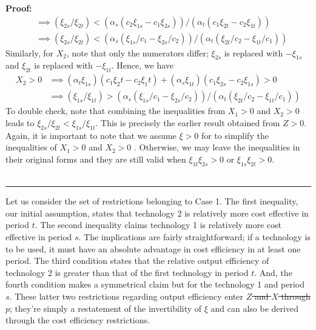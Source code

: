\documentclass[11pt,a4paper,leqno]{extarticle}
\newenvironment{proof}[1][Proof]{\noindent\textbf{#1:} }{\ \rule{0.5em}{0.5em}}
\providecommand{\DIFadd}[1]{{\protect\color{blue}\uwave{#1}}} %
\providecommand{\DIFdel}[1]{{\protect\color{red}\sout{#1}}}                      %
\providecommand{\DIFaddbegin}{} %
\providecommand{\DIFaddend}{} %
\providecommand{\DIFdelbegin}{} %
\providecommand{\DIFdelend}{} %
\begin{document}
\begin{proof}
\begin{align*}
	&\implies (\xi_{2s}/\xi_{2t}) < (\alpha_s (c_2 \xi_{1s} - c_1 \xi_{2s}))/(\alpha_t(c_1 \xi_{2t} - c_2\xi_{1t})) \\
	&\implies (\xi_{2s}/\xi_{2t}) < (\alpha_s (\xi_{1s}/c_1 -  \xi_{2s}/c_2))/(\alpha_t(\xi_{2t}/c_2 - \xi_{1t}/c_1)) 
	\end{align*}
	Similarly, for $X_2$, note that only the numerators differ; $\xi_{2s}$ is replaced with $-\xi_{1s}$ and $\xi_{2t}$ is replaced with $-\xi_{1t}$. Hence, we have
	\begin{align*}
	X_2 > 0 &\implies (\alpha_t \xi_{1s})(c_1 \xi_2t - c_2\xi_1t) + (\alpha_s \xi_{1t})(c_1 \xi_{2s} - c_2 \xi_{1s}) > 0\\
	&\implies (\xi_{1s}/\xi_{1t}) > (\alpha_s (\xi_{1s}/c_1 -  \xi_{2s}/c_2))/(\alpha_t(\xi_{2t}/c_2 - \xi_{1t}/c_1)) 
	\end{align*}
	To double check, note that combining the inequalities from $X_1>0$ and $X_2 > 0$ leads to $\xi_{2s}/\xi_{2t} < \xi_{1s}/\xi_{1t}$. This is precisely the earlier result obtained from \DIFdelbegin \DIFdel{$Z > 0$}\DIFdelend \DIFaddbegin \DIFadd{$\mathbf{Z} > 0$}\DIFaddend . Again, it is  important to note that we assume \DIFdelbegin \DIFdel{$\xi > 0$ }\DIFdelend \DIFaddbegin \DIFadd{$\boldsymbol{\xi} > 0$ }\DIFaddend for to simplify the inequalities of $X_1 > 0$ and $X_2 > 0$ . Otherwise, we may leave the inequalities in their original forms and they are still valid when  $\xi_{1t} \xi_{2s} > 0$ or $\xi_{1s} \xi_{2t} > 0$.   \\ \hfill
\end{proof}

Let us consider the set of restrictions belonging to Case 1. The first inequality, our initial assumption, states that technology 2 is relatively more cost effective in period $t$. The second inequality claims technology 1 is relatively more cost effective in period $s$. The implications are fairly straightforward; if a technology is to be used, it must have an absolute advantage in cost efficiency in at least one period. The third condition states that the relative output efficiency of technology 2 is greater than that of the first technology in period $t$. And, the fourth condition makes a symmetrical claim but for the technology 1 and period $s$. These latter two restrictions regarding output efficiency enter \DIFdelbegin \DIFdel{$Z$ and $X$ through $p$}\DIFdelend \DIFaddbegin \DIFadd{$\mathbf{Z}$ and $\mathbf{X}$ through $\mathbf{p}$}\DIFaddend ; they're simply a restatement of the invertibility of $\xi$ and can also be derived through the cost efficiency restrictions. 
\end{document}
